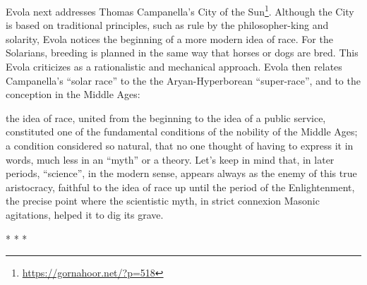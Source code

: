 Evola next addresses Thomas Campanella's City of the Sun\footnote{\url{https://gornahoor.net/?p=518}}. Although the City is based on traditional principles, such as rule by the philosopher-king and solarity, Evola notices the beginning of a more modern idea of race. For the Solarians, breeding is planned in the same way that horses or dogs are bred. This Evola criticizes as a rationalistic and mechanical approach. Evola then relates Campanella's ``solar race'' to the the Aryan-Hyperborean ``super-race'', and to the conception in the Middle Ages:

\begin{quotex}
the idea of race, united from the beginning to the idea of a public service, constituted one of the fundamental conditions of the nobility of the Middle Ages; a condition considered so natural, that no one thought of having to express it in words, much less in an ``myth'' or a theory. Let's keep in mind that, in later periods, ``science'', in the modern sense, appears always as the enemy of this true aristocracy, faithful to the idea of race up until the period of the Enlightenment, the precise point where the scientistic myth, in strict connexion Masonic agitations, helped it to dig its grave.
\end{quotex}




\begin{center}* * *\end{center}

